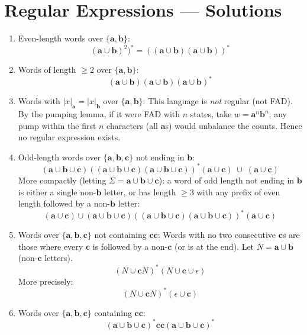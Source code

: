 
\chapter{Regular Expressions --- Solutions}

\begin{enumerate}[{6.}1.]

\item Even-length words over $\{\pmb{a},\pmb{b}\}$:
\[
  (\pmb{a}\cup\pmb{b})^2)^* = ((\pmb{a}\cup\pmb{b})(\pmb{a}\cup\pmb{b}))^*
\]

\item Words of length $\ge 2$ over $\{\pmb{a},\pmb{b}\}$:
\[
  (\pmb{a}\cup\pmb{b})(\pmb{a}\cup\pmb{b})(\pmb{a}\cup\pmb{b})^*
\]

\item Words with $|x|_{\pmb{a}}=|x|_{\pmb{b}}$ over $\{\pmb{a},\pmb{b}\}$: This language is \emph{not} regular (not FAD).  By the pumping lemma, if it were FAD with $n$ states, take $w=\pmb{a}^n\pmb{b}^n$; any pump within the first $n$ characters (all $\pmb{a}$s) would unbalance the counts.  Hence no regular expression exists.

\item Odd-length words over $\{\pmb{a},\pmb{b},\pmb{c}\}$ not ending in $\pmb{b}$:
\[
  (\pmb{a}\cup\pmb{b}\cup\pmb{c})((\pmb{a}\cup\pmb{b}\cup\pmb{c})(\pmb{a}\cup\pmb{b}\cup\pmb{c}))^*(\pmb{a}\cup\pmb{c})
  \;\cup\;
  (\pmb{a}\cup\pmb{c})
\]
More compactly (letting $\Sigma=\pmb{a}\cup\pmb{b}\cup\pmb{c}$):
a word of odd length not ending in $\pmb{b}$ is either a single non-$\pmb{b}$ letter, or has length $\ge 3$ with any prefix of even length followed by a non-$\pmb{b}$ letter:
\[
  (\pmb{a}\cup\pmb{c}) \cup (\pmb{a}\cup\pmb{b}\cup\pmb{c})((\pmb{a}\cup\pmb{b}\cup\pmb{c})(\pmb{a}\cup\pmb{b}\cup\pmb{c}))^*(\pmb{a}\cup\pmb{c})
\]

\item Words over $\{\pmb{a},\pmb{b},\pmb{c}\}$ not containing $\pmb{cc}$:
Words with no two consecutive $\pmb{c}$s are those where every $\pmb{c}$ is followed by a non-$\pmb{c}$ (or is at the end).  Let $N=\pmb{a}\cup\pmb{b}$ (non-$\pmb{c}$ letters).
\[
  (N \cup \pmb{c}N)^*(N \cup \pmb{c} \cup \epsilon)
\]
More precisely:
\[
  (N\cup\pmb{c}N)^*(\epsilon\cup\pmb{c})
\]

\item Words over $\{\pmb{a},\pmb{b},\pmb{c}\}$ containing $\pmb{cc}$:
\[
  (\pmb{a}\cup\pmb{b}\cup\pmb{c})^*\pmb{cc}(\pmb{a}\cup\pmb{b}\cup\pmb{c})^*
\]


\end{enumerate}
